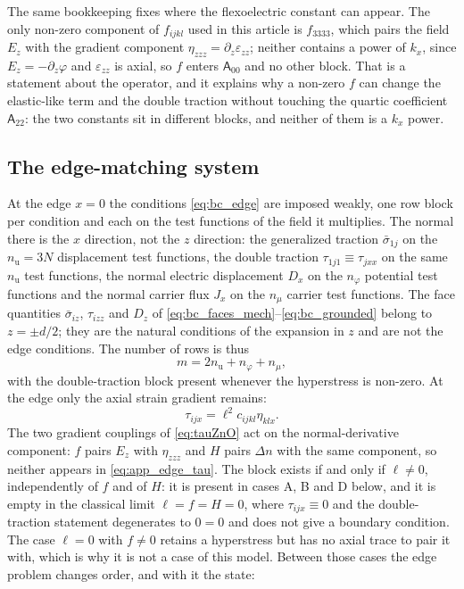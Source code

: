 The same bookkeeping fixes where the flexoelectric constant can appear.  The only
non-zero component of $f_{ijkl}$ used in this article is $f_{3333}$, which pairs
the field $E_z$ with the gradient component $\eta_{zzz}=\partial_z\varepsilon_{zz}$;
neither contains a power of $k_x$, since $E_z=-\partial_z\varphi$ and
$\varepsilon_{zz}$ is axial, so $f$ enters $\mathsf A_{00}$ and no other block.
That is a statement about the operator, and it explains why a non-zero $f$ can
change the elastic-like term and the double traction without touching the quartic
coefficient $\mathsf A_{22}$: the two constants sit in different blocks, and
neither of them is a $k_x$ power.

\subsection{The edge-matching system}

At the edge $x=0$ the conditions \eqref{eq:bc_edge} are imposed weakly, one row
block per condition and each on the test functions of the field it multiplies.
The normal there is the $x$ direction, not the $z$ direction: the generalized
traction $\bar\sigma_{1j}$ on the $n_{\mathrm u}=3N$ displacement test functions,
the double traction $\tau_{1j1}\equiv\tau_{jxx}$ on the same $n_{\mathrm u}$ test
functions, the normal electric displacement $D_x$ on the $n_\varphi$ potential
test functions and the normal carrier flux $J_x$ on the $n_\mu$ carrier test
functions.  The face quantities $\bar\sigma_{iz}$, $\tau_{izz}$ and $D_z$ of
\eqref{eq:bc_faces_mech}--\eqref{eq:bc_grounded} belong to $z=\pm d/2$; they are
the natural conditions of the expansion in $z$ and are not the edge conditions.
The number of rows is thus
\begin{equation}
\label{eq:app_edge_rows}
m=2n_{\mathrm u}+n_\varphi+n_\mu ,
\end{equation}
with the double-traction block present whenever the hyperstress is non-zero.  At the edge only the axial strain gradient remains:
\begin{equation}
\label{eq:app_edge_tau}
\tau_{ijx}=\ell^{2}c_{ijkl}\eta_{klx} .
\end{equation}
The two gradient couplings of \eqref{eq:tauZnO} act on the normal-derivative
component: $f$ pairs $E_z$ with $\eta_{zzz}$ and $H$ pairs $\Delta n$ with the
same component, so neither appears in \eqref{eq:app_edge_tau}.  The block exists if and only if $\ell\neq0$, independently of $f$ and of $H$: it
is present in cases A, B and D below, and it is empty in the classical limit
$\ell=f=H=0$, where $\tau_{ijx}\equiv0$ and the double-traction statement
degenerates to $0=0$ and does not give a boundary condition.  The case $\ell=0$ with
$f\neq0$ retains a hyperstress but has no axial trace to pair it with, which is
why it is not a case of this model.  Between those cases the edge problem changes
order, and with it the state:

